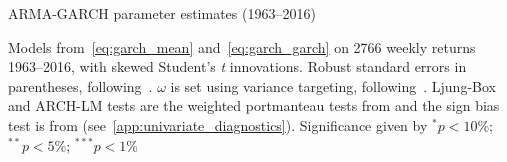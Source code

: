 
\begin{table}
  \centering
  \footnotesize
  \renewcommand{\arraystretch}{1.2}

  \caption{ARMA-GARCH parameter estimates (1963--2016)}

  \begin{longcaption}
    Models from~\autoref{eq:garch_mean} and~\autoref{eq:garch_garch} on \num{2766} weekly returns 1963--2016, with skewed Student's \emph{t} innovations. Robust standard errors in parentheses, following~\textcite{White1982}. $\omega$ is set using variance targeting, following~\textcite{EngleMezrich1995}. Ljung-Box and ARCH-LM tests are the weighted portmanteau tests from \textcite{FisherGallagher2012} and the sign bias test is from \textcite{EngleNg1993} (see~\autoref{app:univariate_diagnostics}). Significance given by $^{*}p<10\%$; $^{**}p<5\%$; $^{***}p<1\%$
  \end{longcaption}
 

\end{table}
